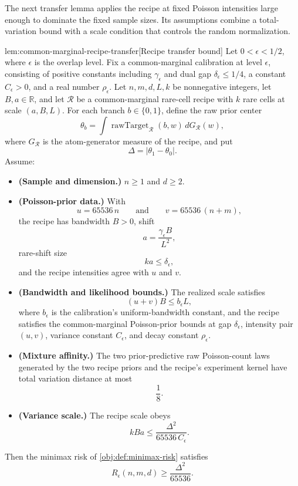 \documentclass[11pt]{article}
\begin{document}
The next transfer lemma applies the recipe at fixed Poisson intensities large enough to dominate the fixed sample sizes. Its assumptions combine a total-variation bound with a scale condition that controls the random normalization.

\begin{lemmav}{lem:common-marginal-recipe-transfer}[Recipe transfer bound]
Let \(0<\epsilon<1/2\), where \(\epsilon\) is the overlap level.  Fix a common-marginal calibration at level \(\epsilon\), consisting of positive constants including \(\gamma_\epsilon\) and dual gap \(\delta_\epsilon\le 1/4\), a constant \(C_\epsilon>0\), and a real number \(\rho_\epsilon\).  Let \(n,m,d,L,k\) be nonnegative integers, let \(B,a\in\mathbb R\), and let \(\mathcal R\) be a common-marginal rare-cell recipe with \(k\) rare cells at scale \((a,B,L)\).  For each branch \(b\in\{0,1\}\), define the raw prior center
\[
\theta_b=\int \operatorname{rawTarget}_{\mathcal R}(b,w)\,dG_{\mathcal R}(w),
\]
where \(G_{\mathcal R}\) is the atom-generator measure of the recipe, and put
\[
\Delta=|\theta_1-\theta_0|.
\]
Assume:
\begin{itemize}
\item \textbf{(Sample and dimension.)} \(n\ge 1\) and \(d\ge 2\).
\item \textbf{(Poisson-prior data.)} With
\[
u=65536\,n
\qquad\text{and}\qquad
v=65536\,(n+m),
\]
the recipe has bandwidth \(B>0\), shift
\[
a=\frac{\gamma_\epsilon B}{L^2},
\]
rare-shift size
\[
ka\le \delta_\epsilon,
\]
and the recipe intensities agree with \(u\) and \(v\).
\item \textbf{(Bandwidth and likelihood bounds.)} The realized scale satisfies
\[
(u+v)B\le b_\epsilon L,
\]
where \(b_\epsilon\) is the calibration's uniform-bandwidth constant, and the recipe satisfies the common-marginal Poisson-prior bounds at gap \(\delta_\epsilon\), intensity pair \((u,v)\), variance constant \(C_\epsilon\), and decay constant \(\rho_\epsilon\).
\item \textbf{(Mixture affinity.)} The two prior-predictive raw Poisson-count laws generated by the two recipe priors and the recipe's experiment kernel have total variation distance at most
\[
\frac18 .
\]
\item \textbf{(Variance scale.)} The recipe scale obeys
\[
kBa\le \frac{\Delta^2}{65536\,C_\epsilon}.
\]
\end{itemize}
Then the minimax risk of \cref{obj:def:minimax-risk} satisfies
\[
R_\epsilon(n,m,d)\ge \frac{\Delta^2}{65536}.
\]
\end{lemmav}
\end{document}
